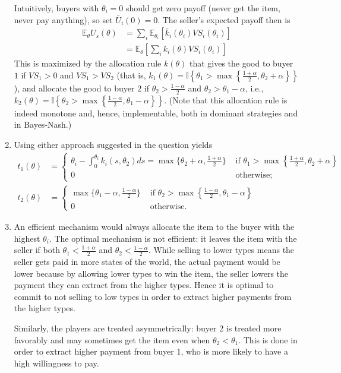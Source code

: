\documentclass[a4paper]{article}
\begin{document}
\begin{enumerate}
	Intuitively, buyers with $\theta_i = 0$ should get zero payoff (never get the item, never pay anything), so set $\bar{U}_i(0) = 0$.
	The seller's expected payoff then is
	\begin{align*}
		\mathbb{E}_\theta U_s(\theta) &= \sum_i \mathbb{E}_{\theta_i} \left[\bar{k}_i(\theta_i) VS_i(\theta_i)\right]
		\\
		&= \mathbb{E}_{\theta} \left[\sum_i k_i(\theta) VS_i(\theta_i)\right]
	\end{align*}
	This is maximized by the allocation rule $k(\theta)$ that gives the good to buyer $1$ if $VS_1>0$ and $VS_1>VS_2$ (that is, $k_1(\theta) = \mathbb{I} \left\{ \theta_1 > \max \left\{ \frac{1+\alpha}{2}, \theta_2+\alpha \right\} \right\}$), and allocate the good to buyer $2$ if $\theta_2>\frac{1-\alpha}{2}$ and $\theta_2>\theta_1-\alpha$, i.e., $k_2(\theta) = \mathbb{I} \left\{ \theta_2 > \max \left\{ \frac{1-\alpha}{2}, \theta_1-\alpha \right\} \right\}$. (Note that this allocation rule is indeed monotone and, hence, implementable, both in dominant strategies and in Bayes-Nash.)
	
	\item Using either approach suggested in the question yields
	\begin{align*}
		t_1(\theta)&=\begin{cases} 
			\theta_i-\int_0^{\theta_i}k_i(s,\theta_2)ds=\max\{\theta_2+\alpha,\frac{1+\alpha}{2}\} & \text{ if } \theta_1 > \max \left\{ \frac{1+\alpha}{2}, \theta_2+\alpha \right\}
			\\
			0 &\text{ otherwise};
		\end{cases}
		\\
		t_2(\theta)&=\begin{cases} 
			\max\{\theta_1-\alpha,\frac{1-\alpha}{2}\} & \text{ if } \theta_2 > \max \left\{ \frac{1-\alpha}{2}, \theta_1-\alpha \right\}
			\\
			0 &\text{ otherwise.}
		\end{cases}
	\end{align*}

	\item An efficient mechanism would always allocate the item to the buyer with the highest $\theta_i$. The optimal mechanism is not efficient: it leaves the item with the seller if both $\theta_1 < \frac{1+\alpha}{2}$ and $\theta_2 < \frac{1-\alpha}{2}$. While selling to lower types means the seller gets paid in more states of the world, the actual payment would be lower because by allowing lower types to win the item, the seller lowers the payment they can extract from the higher types. Hence it is optimal to commit to not selling to low types in order to extract higher payments from the higher types. 
	
	Similarly, the players are treated asymmetrically: buyer 2 is treated more favorably and may sometimes get the item even when $\theta_2 < \theta_1$. This is done in order to extract higher payment from buyer 1, who is more likely to have a high willingness to pay.
\end{enumerate}
\end{document}
